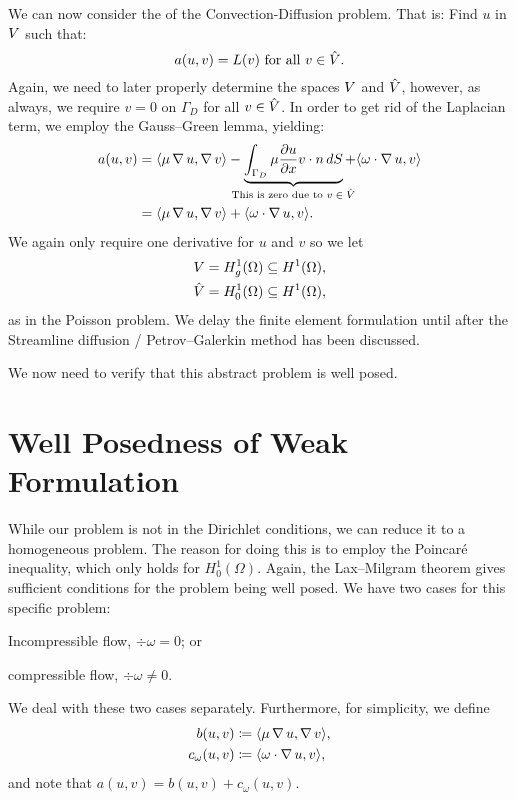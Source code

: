 We can now consider the  of the Convection-Diffusion
problem. That is: Find \( u \) in \( V \) such that:
\begin{equation}
    a(u, v) = L(v) \text{ for all } v \in \hat{V}.
\end{equation}
Again, we need to later properly determine the spaces \( V \) and \( \hat{V}
\), however, as always, we require \( v = 0 \) on \( \Gamma_D \) for all \( v
\in \hat{V} \).  In order to get rid of the Laplacian term, we employ the
Gauss--Green lemma, yielding:
\begin{align}
a(u, v) &= \langle \mu \grad u, \grad v \rangle - \underbrace{\int_{\Gamma_D}
\mu \frac{\partial u}{\partial x} v \cdot n \, dS}_{\mathclap{\text{This is zero due to
\( v \in \test\)}}} + \langle \omega \cdot \grad u, v \rangle \\
&= \langle \mu \grad u, \grad v \rangle +  \langle \omega \cdot \grad u, v \rangle.
\end{align}
We again only require one derivative for \( u \) and \( v \) so we let
\begin{align}
    V = H^1_g(\Omega) \subseteq H^1(\Omega), \\
    \hat{V} = H^1_0(\Omega) \subseteq H^1(\Omega),
\end{align}
as in the Poisson problem. We delay the finite element formulation until after
the Streamline diffusion / Petrov--Galerkin method has been discussed.

We now need to verify that this abstract problem is well posed.

\section{Well Posedness of Weak Formulation}

While our problem is not  in the Dirichlet conditions, we can
reduce it to a homogeneous problem. The reason for doing this is to employ the
Poincar\'e inequality, which only holds for \( H^1_0 (\Omega) \). Again, the
Lax--Milgram theorem gives sufficient conditions for the problem being well
posed. We have two cases for this specific problem:
\begin{inparaenum}[(i)]
    \item Incompressible flow, \( \div \omega = 0\); or
    \item compressible flow, \( \div \omega \neq 0\).
\end{inparaenum}
We deal with these two cases separately.
Furthermore, for simplicity, we define
\begin{align}
    b(u, v) &\coloneqq \langle \mu \operatorname{\mathop{}\!\nabla} u, \operatorname{\mathop{}\!\nabla} v \rangle,\\
    c_\omega(u, v) &\coloneqq \langle \omega \cdot \operatorname{\mathop{}\!\nabla} u, v \rangle,
\end{align}
and note that \(a(u, v) = b(u, v) + c_\omega(u, v)\).

